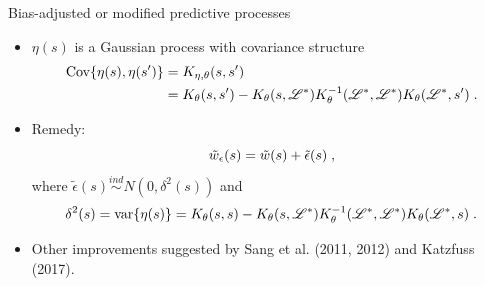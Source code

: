 \begin{frame}{Bias-adjusted or modified predictive processes}
 
 \begin{itemize}
  \item $\eta(s)$ is a Gaussian process with covariance structure 
\begin{align*}
 \mbox{Cov}\{\eta(s), \eta(s')\} &= K_{\eta, \theta}(s,s') \\
  &= K_{\theta}(s,s') - K_{\theta}(s, {\cal L}^*)K_{\theta}^{-1}({\cal L}^*,{\cal L}^*)K_{\theta}({\cal L}^*,s')\; .
\end{align*}

  \item Remedy:
\begin{equation*}\label{wq: modified_predictive_process}
 \tilde{w}_{\epsilon}(s) = \tilde{w}(s) + \tilde{\epsilon}(s)\; ,
\end{equation*}
where $\tilde{\epsilon}(s)\stackrel{ind}{\sim} N(0,\delta^2(s))$ and 
\[
 \delta^2(s) = \mbox{var}\{\eta(s)\} = K_{\theta}(s,s) - K_{\theta}(s, {\cal L}^*)K_{\theta}^{-1}({\cal L}^*,{\cal L}^*)K_{\theta}({\cal L}^*,s)\; .
\]

 \item Other improvements suggested by Sang et al. (2011, 2012) and Katzfuss (2017).

\end{itemize}
 
\end{frame}

